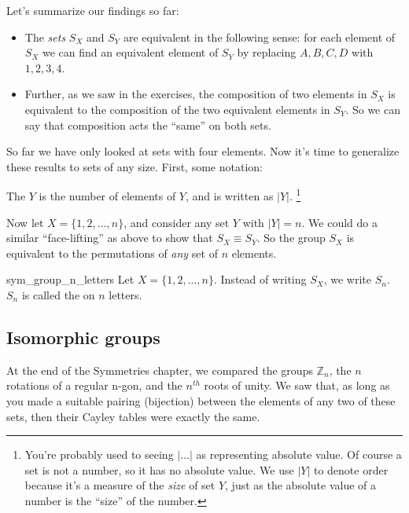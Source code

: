Let's summarize our findings so far:
\begin{itemize}
\item
The \emph{sets} $S_X$ and $S_Y$ are equivalent in the following sense: for each element of $S_X$ we can find an equivalent element of $S_Y$ by replacing $A, B, C, D$ with $1, 2, 3, 4$.  

\item
Further, as we saw in the exercises,  the composition of two elements in $S_X$ is equivalent to the composition of the two equivalent elements in $S_Y$.  So we can say that composition acts the ``same'' on both sets.
\end{itemize}


So far we have only looked at sets with four elements. Now it's time to generalize these results to sets of any size. First, some notation:

\begin{notation}{}
The  $Y$ is the number of elements of $Y$, and is written as $|Y|$.
\footnote{ You're probably used to seeing $|\ldots|$ as representing absolute value. Of course a set is not a number, so it has no absolute value. We use $|Y|$ to denote order because it's a measure of the \emph{size} of set $Y$, just as the absolute value of a number is the ``size'' of the number.}
\end{notation}

Now let $X = \{1,2,\ldots, n\}$, and  consider any set $Y$ with $|Y| = n$. We could do a similar ``face-lifting'' as above to show that  $S_X \equiv S_Y$.  So the group $S_X$ is equivalent to the permutations of \emph{any} set of $n$ elements.

\begin{notation}{sym_group_n_letters}
Let $X=\{ 1, 2, \ldots, n\}$. Instead of writing $S_X$, we write $S_n$\label{symmetricgroup}.  $S_n$ is called the  on $n$ letters.
\end{notation}

\subsection{Isomorphic groups}

At the end of the Symmetries chapter, we compared the groups $\mathbb{Z}_n$, the $n$ rotations of a regular n-gon, and the $n^{th}$ roots of unity.  We saw that, as long as you made a suitable pairing (bijection) between the elements of any two of these sets, then their Cayley tables were exactly the same. 

